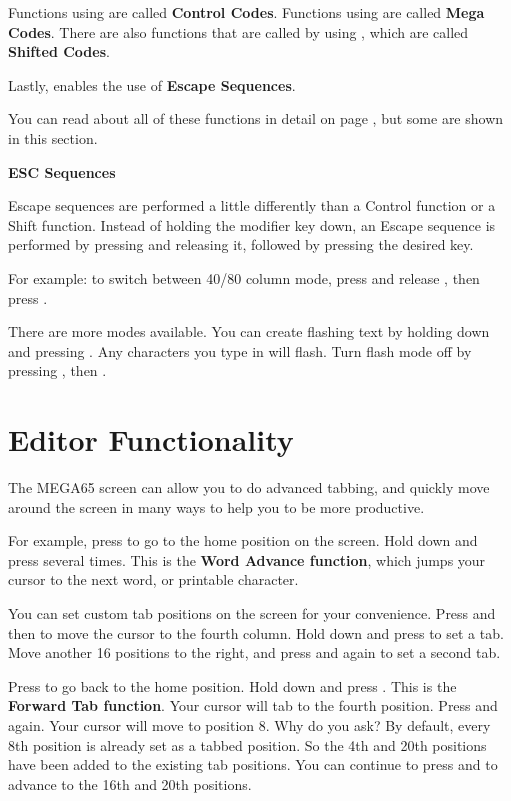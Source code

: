 Functions using  are called \textbf{Control Codes}.
Functions using \megasymbolkey are called \textbf{Mega Codes}. There are also functions that are called by using , which
are called \textbf{Shifted Codes}.

Lastly,  enables the use of \textbf{Escape Sequences}.

You can read about all of these functions in detail on page \pageref{appendix:controlcodes}, but some are shown in this section.

\needspace{2cm}
\textbf{ESC Sequences}

Escape sequences are performed a little differently than a Control function or a Shift function. Instead of holding the modifier key down, an Escape sequence is performed by pressing  and releasing it, followed by pressing the desired key.

For example: to switch between 40/80 column mode, press and release , then press .

There are more modes available. You can create flashing text by holding  down and pressing . Any characters you type in will flash. Turn flash mode off by pressing ,  then .



\section{Editor Functionality}


The MEGA65 screen can allow you to do advanced tabbing, and quickly move around the screen in many ways to help you to be more productive.

For example, press  to go to the home position on the screen. Hold  down and press  several times. This is the \textbf{Word Advance function}, which jumps your cursor to the next word, or printable character.

You can set custom tab positions on the screen for your convenience. Press  and then \megakey{$\rightarrow$} to move the cursor to the fourth column. Hold down  and press  to set a tab. Move another 16 positions to the right, and press  and  again to set a second tab.

Press  to go back to the home position. Hold  down and press . This is the \textbf{Forward Tab function}. Your cursor will tab to the fourth position. Press  and  again. Your cursor will move to position 8. Why do you ask? By default, every 8th position is already set as a tabbed position. So the 4th and 20th positions have been added to the existing tab positions. You can continue to press  and  to advance to the 16th and 20th positions.

